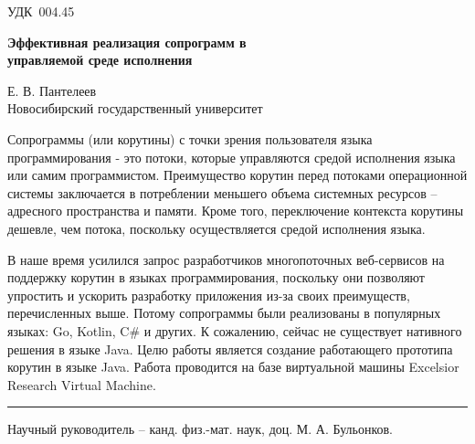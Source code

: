 \documentclass[a5paper,10pt]{extreport}
\def\udcK#1{\noindent УДК~{#1}}
\def\titleK#1{\begin{center}{\textbf {#1}}\end{center}}
\def\authorK#1{\begin{center}{#1}\end{center}}
\def\advisorK#1{Научный руководитель -- {#1}}
\newenvironment{abstractK}{}{~\newline\parindent=5mm\rule{5.5cm}{0.3pt}}
\newtheorem{lemma}{Лемма}
\newtheorem{theorem}{Теорема}
\newtheorem{corollary}{Следствие}
\newtheorem{proposition}{Предложение}
\theoremstyle{definition}
\newtheorem{definition}{Определение}
\theoremstyle{definition}
\newtheorem{question}{Вопрос}
\theoremstyle{definition}
\newtheorem{conjecture}{Гипотеза}
\begin{document}
\udcK{004.45}
\titleK{Эффективная реализация сопрограмм в \\управляемой среде исполнения}
\authorK{Е. В. Пантелеев\\
Новосибирский государственный университет}

\begin{abstractK}
Сопрограммы (или корутины) с точки зрения пользователя языка программирования - это потоки, которые управляются средой исполнения языка или самим программистом. Преимущество корутин перед потоками операционной системы заключается в потреблении меньшего объема системных ресурсов – адресного пространства и памяти. Кроме того, переключение контекста корутины дешевле, чем потока, поскольку осуществляется средой исполнения языка. 
\par
В наше время усилился запрос разработчиков многопоточных веб-сервисов на поддержку корутин в языках программирования, поскольку они позволяют упростить и ускорить разработку приложения из-за своих преимуществ, перечисленных выше. Потому сопрограммы были реализованы в популярных языках: Go, Kotlin, C\# и других. К сожалению, сейчас не существует нативного решения в языке Java.
Целю работы является создание работающего прототипа корутин в языке Java. Работа проводится на базе виртуальной машины Excelsior Research Virtual Machine. 
\end{abstractK}

\advisorK{канд. физ.-мат. наук, доц. М. А. Бульонков.}
\end{document}
